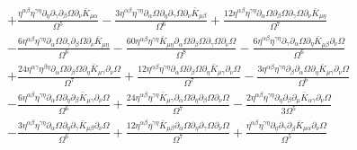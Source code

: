 \documentclass[10pt,letterpaper]{article}
\begin{document}
\begin{align}
& + \frac{\eta^{\alpha \beta} \eta^{\gamma \eta} \partial_{\eta}\partial_{\gamma}\partial_{\beta}\Omega \partial_{\nu}\bar{K}_{\mu \alpha}}{\Omega^5} -  \frac{3 \eta^{\alpha \beta} \eta^{\gamma \eta} \partial_{\alpha}\Omega \partial_{\eta}\partial_{\gamma}\Omega \partial_{\nu}\bar{K}_{\mu \beta}}{\Omega^6} + \frac{12 \eta^{\alpha \beta} \eta^{\gamma \eta} \partial_{\alpha}\Omega \partial_{\beta}\Omega \partial_{\gamma}\Omega \partial_{\nu}\bar{K}_{\mu \eta}}{\Omega^7} \nonumber \\
&-  \frac{6 \eta^{\alpha \beta} \eta^{\gamma \eta} \partial_{\alpha}\Omega \partial_{\gamma}\partial_{\beta}\Omega \partial_{\nu}\bar{K}_{\mu \eta}}{\Omega^6} -  \frac{60 \eta^{\alpha \beta} \eta^{\gamma \eta} \bar{K}_{\mu \eta} \partial_{\alpha}\Omega \partial_{\beta}\Omega \partial_{\gamma}\Omega \partial_{\nu}\Omega}{\Omega^8} -  \frac{6 \eta^{\alpha \beta} \eta^{\gamma \eta} \partial_{\gamma}\partial_{\alpha}\Omega \partial_{\eta}\bar{K}_{\mu \beta} \partial_{\nu}\Omega}{\Omega^6} \nonumber \\
&+ \frac{24 \eta^{\alpha \gamma} \eta^{\beta \eta} \partial_{\alpha}\Omega \partial_{\beta}\Omega \partial_{\eta}\bar{K}_{\mu \gamma} \partial_{\nu}\Omega}{\Omega^7} + \frac{12 \eta^{\alpha \beta} \eta^{\gamma \eta} \partial_{\alpha}\Omega \partial_{\beta}\Omega \partial_{\eta}\bar{K}_{\mu \gamma} \partial_{\nu}\Omega}{\Omega^7} -  \frac{3 \eta^{\alpha \beta} \eta^{\gamma \eta} \partial_{\beta}\partial_{\alpha}\Omega \partial_{\eta}\bar{K}_{\mu \gamma} \partial_{\nu}\Omega}{\Omega^6} \nonumber \\
&-  \frac{6 \eta^{\alpha \beta} \eta^{\gamma \eta} \partial_{\alpha}\Omega \partial_{\eta}\partial_{\beta}\bar{K}_{\mu \gamma} \partial_{\nu}\Omega}{\Omega^6} + \frac{24 \eta^{\alpha \beta} \eta^{\gamma \eta} \bar{K}_{\mu \gamma} \partial_{\alpha}\Omega \partial_{\eta}\partial_{\beta}\Omega \partial_{\nu}\Omega}{\Omega^7} -  \frac{2 \eta^{\alpha \beta} \eta^{\gamma \eta} \partial_{\eta}\partial_{\beta}\partial_{\mu}\bar{K}_{\alpha \gamma} \partial_{\nu}\Omega}{3 \Omega^5}\nonumber \\
& -  \frac{3 \eta^{\alpha \beta} \eta^{\gamma \eta} \partial_{\alpha}\Omega \partial_{\eta}\partial_{\gamma}\bar{K}_{\mu \beta} \partial_{\nu}\Omega}{\Omega^6} + \frac{12 \eta^{\alpha \beta} \eta^{\gamma \eta} \bar{K}_{\mu \beta} \partial_{\alpha}\Omega \partial_{\eta}\partial_{\gamma}\Omega \partial_{\nu}\Omega}{\Omega^7} + \frac{\eta^{\alpha \beta} \eta^{\gamma \eta} \partial_{\eta}\partial_{\gamma}\partial_{\beta}\bar{K}_{\mu \alpha} \partial_{\nu}\Omega}{\Omega^5} \nonumber \\

\end{align}
\end{document}
